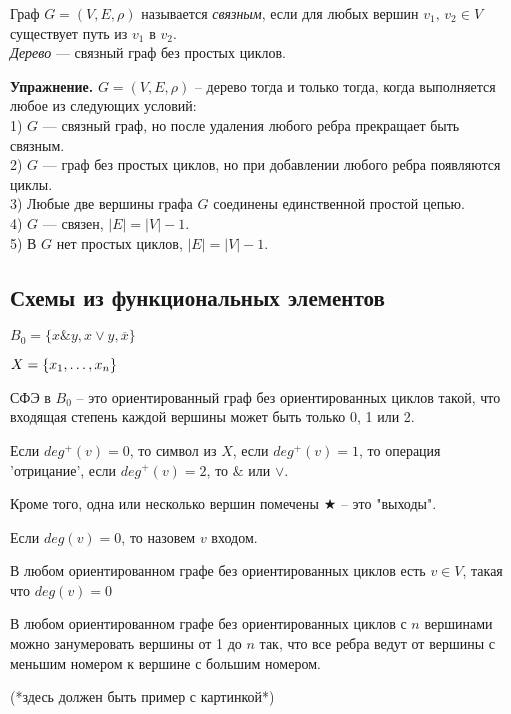\begin{df}
Граф $G = (V, E, \rho)$ называется \textit{связным}, если для любых вершин $v_1,\,v_2\in V$ существует путь из $v_1$ в $v_2$.\\
\textit{Дерево} --- связный граф без простых циклов.
\end{df}

\textbf{Упражнение.} $G = (V, E, \rho)$ -- дерево тогда и только тогда, когда выполняется любое из следующих условий:\\
1) $G$ --- связный граф, но после удаления любого ребра прекращает быть связным.\\
2) $G$ --- граф без простых циклов, но при добавлении любого ребра появляются циклы.\\
3) Любые две вершины графа $G$ соединены единственной простой цепью.\\
4) $G$ --- связен, $|E| = |V| - 1$.\\
5) В $G$ нет простых циклов, $|E| = |V| - 1$.

\subsection{Схемы из функциональных элементов}

$B_0 = \{x \& y, x \vee y, \overline{x}\}$  

$X = \{x_1, \ldots, x_n\}$

СФЭ в $B_0$ -- это ориентированный граф без ориентированных циклов такой, что входящая степень каждой вершины может быть только 0, 1 или 2.

Если $deg^{+}(v) = 0$, то символ из $X$, если $deg^{+}(v) = 1$, то операция 'отрицание', если $deg^{+}(v) = 2$, то $\&$ или $\vee$.

Кроме того, одна или несколько вершин помечены $\bigstar$  -- это "выходы".

Если $deg(v) = 0$, то назовем $v$ входом.

\begin{stm}
	В любом ориентированном графе без ориентированных циклов есть $v \in V$, такая что $deg(v) = 0$
\end{stm}

\begin{stm}
	В любом ориентированном графе без ориентированных циклов с $n$ вершинами можно занумеровать вершины от 1 до $n$ так, что все ребра ведут от вершины с меньшим номером к вершине с большим номером.
\end{stm}

(*здесь должен быть пример с картинкой*)



